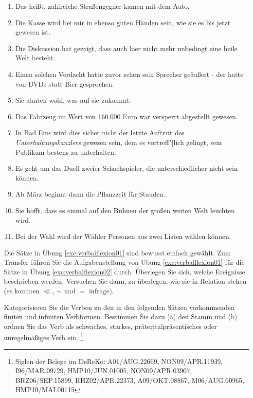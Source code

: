 \begin{sloppypar}
\begin{enumerate}
  \item Das heißt, zahlreiche Straßengegner kamen mit dem Auto.
  \item Die Kasse wird bei mir in ebenso guten Händen sein, wie sie es bis jetzt gewesen ist.
  \item Die Diskussion hat gezeigt, dass auch hier nicht mehr unbedingt eine heile Welt besteht.
  \item Einen solchen Verdacht hatte zuvor schon sein Sprecher geäußert - der hatte von DVDs statt Bier gesprochen.
  \item Sie ahnten wohl, was auf sie zukommt.
  \item Das Fahrzeug im Wert von 160.000 Euro war versperrt abgestellt gewesen.
  \item In Bad Ems wird dies sicher nicht der letzte Auftritt des \textit{Unterhaltungskanzlers} gewesen sein, dem es vortreff"|lich gelingt, sein Publikum bestens zu unterhalten.
  \item Es geht um das Duell zweier Schachspieler, die unterschiedlicher nicht sein können.
  \item Ab März beginnt dann die Pflanzzeit für Stauden.
  \item Sie hofft, dass es einmal auf den Bühnen der großen weiten Welt leuchten wird.
  \item Bei der Wahl wird der Wähler Personen aus zwei Listen wählen können.
\end{enumerate}

\Uebung[\tristar]{} \label{exc:verbalflexion03} Die Sätze in Übung \ref{exc:verbalflexion01} sind bewusst einfach gewählt.
Zum Transfer führen Sie die Aufgabenstellung von Übung \ref{exc:verbalflexion01} für die Sätze in Übung \ref{exc:verbalflexion02} durch.
Überlegen Sie sich, welche Ereignisse beschrieben werden.
Versuchen Sie dann, zu überlegen, wie sie in Relation stehen (es kommen $\ll$, $\sim$ und $=$ infrage).

 \label{exc:verbalflexion04} Kategorisieren Sie die Verben zu den in den folgenden Sätzen vorkommenden finiten und infiniten Verbformen.
Bestimmen Sie dazu (a) den Stamm und (b) ordnen Sie das Verb als schwaches, starkes, präteritalpräsentisches oder unregelmäßiges Verb ein.%
\footnote{Siglen der Belege im DeReKo: A01\slash AUG.22669, NON09\slash APR.11939, I96\slash MAR.09729, HMP10\slash JUN.01005, NON09\slash APR.03907, BRZ06\slash SEP.15899, RHZ02\slash APR.22373, A09\slash OKT.08867, M06\slash AUG.60965, HMP10\slash MAI.00115}


\end{sloppypar}
